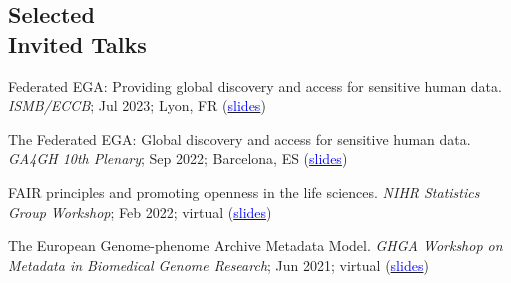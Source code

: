 \documentclass[margin,line]{res}
\begin{document}
\begin{resume}
\section{\sc Selected\\ Invited Talks}

Federated EGA: Providing global discovery and access for sensitive human data. {\em ISMB/ECCB}; Jul 2023; Lyon, FR (\href{https://docs.google.com/presentation/d/1P9KMd-NAjbz1f9fgO9FVuyYTVAoYZoJAqL0wvnVNrt4/edit?usp=sharing}{\textcolor{blue}{slides}})

The Federated EGA: Global discovery and access for sensitive human data. {\em GA4GH 10th Plenary}; Sep 2022; Barcelona, ES (\href{https://docs.google.com/presentation/d/17wJu5ntPdT1Uj3kSOd_ROHY0DK7IzRwRq6Lgyvso2aw/edit?usp=sharing}{\textcolor{blue}{slides}})


FAIR principles and promoting openness in the life sciences. {\em NIHR Statistics Group Workshop}; Feb 2022; virtual (\href{https://docs.google.com/presentation/d/1BNdhj_Ny7qJ84xmoUuzqIicYXF3UwwcGdJTLtyZkV5I/edit?usp=sharing}{\textcolor{blue}{slides}})

The European Genome-phenome Archive Metadata Model. {\em GHGA Workshop on Metadata in Biomedical Genome Research}; Jun 2021; virtual (\href{https://docs.google.com/presentation/d/14x9PNs3j5mNZWIHBW9k6aiJUekiLYsrbrkpaMihB4ko/edit?usp=sharing}{\textcolor{blue}{slides}})






\end{resume}
\end{document}
